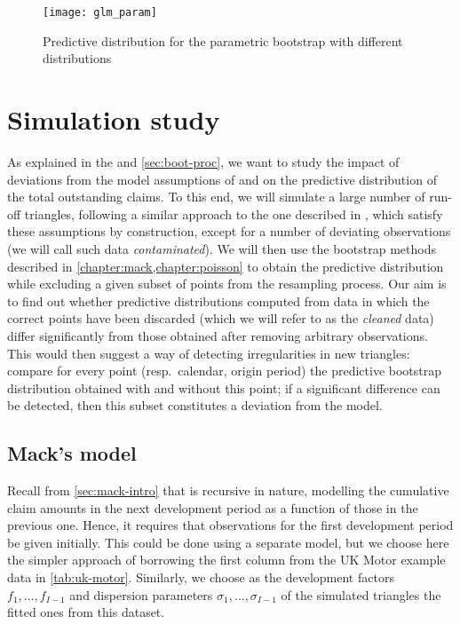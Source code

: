 \documentclass[a4paper]{book}
\begin{document}
\begin{figure}[!p]
  \texttt{[image: glm\_param]}
  \caption{Predictive distribution for the parametric bootstrap with different distributions}
  \label{fig:odp-pred-dist-param}
\end{figure}

\chapter{Simulation study}

As explained in the  and \cref{sec:boot-proc}, we want to study the impact of deviations from the model assumptions of  and  on the predictive distribution of the total outstanding claims. To this end, we will simulate a large number of run-off triangles, following a similar approach to the one described in \cite{schiegl}, which satisfy these assumptions by construction, except for a number of deviating observations (we will call such data \emph{contaminated}). We will then use the bootstrap methods described in \cref{chapter:mack,chapter:poisson} to obtain the predictive distribution while excluding a given subset of points from the resampling process. Our aim is to find out whether predictive distributions computed from data in which the correct points have been discarded (which we will refer to as the \emph{cleaned} data) differ significantly from those obtained after removing arbitrary observations. This would then suggest a way of detecting irregularities in new triangles: compare for every point (resp.\ calendar, origin period) the predictive bootstrap distribution obtained with and without this point; if a significant difference can be detected, then this subset constitutes a deviation from the model.


\section{Mack's model} \label{sec:mack-sim}

Recall from \cref{sec:mack-intro} that  is recursive in nature, modelling the cumulative claim amounts in the next development period as a function of those in the previous one. Hence, it requires that observations for the first development period be given initially. This could be done using a separate model, but we choose here the simpler approach of borrowing the first column from the UK Motor example data in \cref{tab:uk-motor}. Similarly, we choose as the development factors $f_1, \dots, f_{I - 1}$ and dispersion parameters $\sigma_1, \dots, \sigma_{I - 1}$ of the simulated triangles the fitted ones from this dataset.
\end{document}
